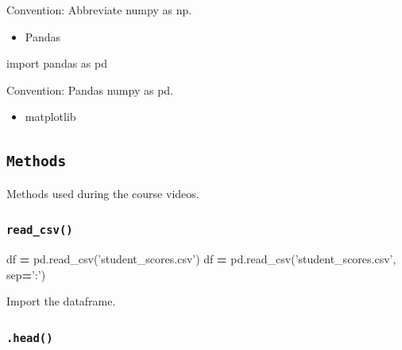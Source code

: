 \documentclass[]{book}
\newenvironment{Shaded}{\begin{snugshade}}{\end{snugshade}}
\newcommand{\StringTok}[1]{\textcolor[rgb]{0.31,0.60,0.02}{#1}}
\newcommand{\ImportTok}[1]{#1}
\newcommand{\OperatorTok}[1]{\textcolor[rgb]{0.81,0.36,0.00}{\textbf{#1}}}
\newcommand{\NormalTok}[1]{#1}
\providecommand{\tightlist}{%
  \setlength{\itemsep}{0pt}\setlength{\parskip}{0pt}}
\begin{document}
Convention: Abbreviate numpy as np.

\begin{itemize}
\tightlist
\item
  Pandas
\end{itemize}

\begin{Shaded}
\begin{Highlighting}[]
\ImportTok{import}\NormalTok{ pandas }\ImportTok{as}\NormalTok{ pd}
\end{Highlighting}
\end{Shaded}

Convention: Pandas numpy as pd.

\begin{itemize}
\tightlist
\item
  matplotlib
\end{itemize}

\begin{Shaded}
\end{Shaded}

\subsection{\texorpdfstring{\texttt{Methods}}{Methods}}\label{methods-3}

Methods used during the course videos.

\subsubsection{\texorpdfstring{\texttt{read\_csv()}}{read\_csv()}}\label{read_csv}

\begin{Shaded}
\begin{Highlighting}[]
\NormalTok{df }\OperatorTok{=}\NormalTok{ pd.read_csv(}\StringTok{'student_scores.csv'}\NormalTok{)}
\NormalTok{df }\OperatorTok{=}\NormalTok{ pd.read_csv(}\StringTok{'student_scores.csv'}\NormalTok{, sep}\OperatorTok{=}\StringTok{':'}\NormalTok{)}
\end{Highlighting}
\end{Shaded}

Import the dataframe.

\subsubsection{\texorpdfstring{\texttt{.head()}}{.head()}}\label{head}
\end{document}

